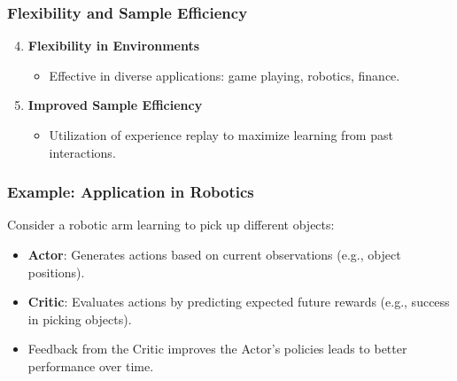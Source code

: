 \documentclass{beamer}
\begin{document}
\begin{frame}[fragile]
    \frametitle{Flexibility and Sample Efficiency}
    \begin{enumerate}
        \setcounter{enumi}{3}
        \item \textbf{Flexibility in Environments}
            \begin{itemize}
                \item Effective in diverse applications: game playing, robotics, finance.
            \end{itemize}
        \item \textbf{Improved Sample Efficiency}
            \begin{itemize}
                \item Utilization of experience replay to maximize learning from past interactions.
            \end{itemize}
    \end{enumerate}
\end{frame}

\begin{frame}[fragile]
    \frametitle{Example: Application in Robotics}
    Consider a robotic arm learning to pick up different objects:
    \begin{itemize}
        \item \textbf{Actor}: Generates actions based on current observations (e.g., object positions).
        \item \textbf{Critic}: Evaluates actions by predicting expected future rewards (e.g., success in picking objects).
        \item Feedback from the Critic improves the Actor's policies leads to better performance over time.
    \end{itemize}
\end{frame}
\end{document}
